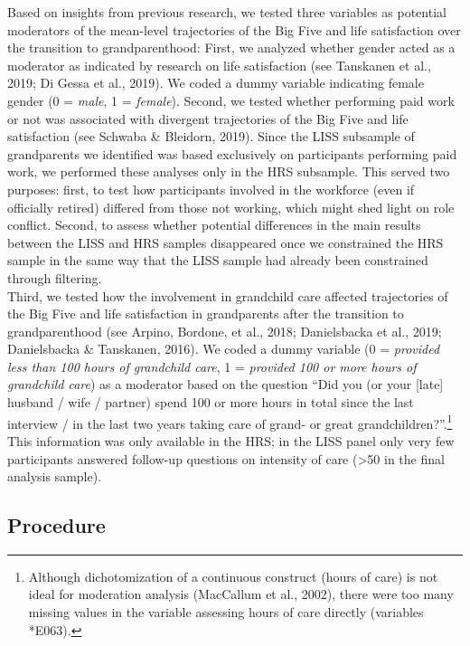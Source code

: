 \documentclass[
  english,
  man, noextraspace]{apa7}
\begin{document}
Based on insights from previous research, we tested three variables as potential moderators of the mean-level trajectories of the Big Five and life satisfaction over the transition to grandparenthood: First, we analyzed whether gender acted as a moderator as indicated by research on life satisfaction (see Tanskanen et al., 2019; Di Gessa et al., 2019). We coded a dummy variable indicating female gender (0 = \emph{male}, 1 = \emph{female}). Second, we tested whether performing paid work or not was associated with divergent trajectories of the Big Five and life satisfaction (see Schwaba \& Bleidorn, 2019). Since the LISS subsample of grandparents we identified was based exclusively on participants performing paid work, we performed these analyses only in the HRS subsample. This served two purposes: first, to test how participants involved in the workforce (even if officially retired) differed from those not working, which might shed light on role conflict. Second, to assess whether potential differences in the main results between the LISS and HRS samples disappeared once we constrained the HRS sample in the same way that the LISS sample had already been constrained through filtering.\\
Third, we tested how the involvement in grandchild care affected trajectories of the Big Five and life satisfaction in grandparents after the transition to grandparenthood (see Arpino, Bordone, et al., 2018; Danielsbacka et al., 2019; Danielsbacka \& Tanskanen, 2016). We coded a dummy variable (0 = \emph{provided less than 100 hours of grandchild care}, 1 = \emph{provided 100 or more hours of grandchild care}) as a moderator based on the question \enquote{Did you (or your {[}late{]} husband / wife / partner) spend 100 or more hours in total since the last interview / in the last two years taking care of grand- or great grandchildren?}.\footnote{Although dichotomization of a continuous construct (hours of care) is not ideal for moderation analysis (MacCallum et al., 2002), there were too many missing values in the variable assessing hours of care directly (variables *E063).} This information was only available in the HRS; in the LISS panel only very few participants answered follow-up questions on intensity of care (\textgreater50 in the final analysis sample).

\hypertarget{procedure}{%
\subsection{Procedure}\label{procedure}}
\end{document}
